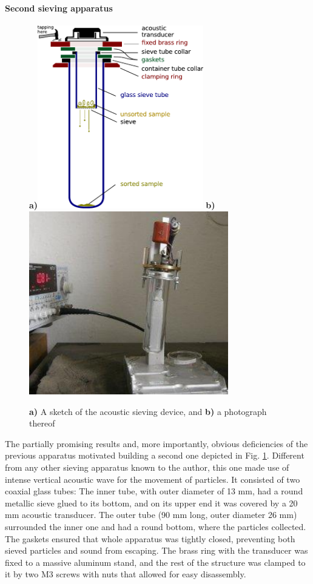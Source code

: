 \paragraph{Second sieving apparatus}%
\begin{figure}[ht] \caption{\textbf{a)} A sketch of the acoustic sieving device, and \textbf{b)} a photograph thereof} \label{fg_sieving2} \centering 
\textbf{a)}\includegraphics[height=8cm]{img/technology/sieve2_sieving_scheme.pdf}
\textbf{b)}\includegraphics[height=8cm]{img/technology/sieving_m.pdf}
\end{figure}
The partially promising results and, more importantly, obvious deficiencies of the previous apparatus motivated building a second one depicted in Fig. \ref{fg_sieving2}.
Different from any other sieving apparatus known to the author, this one made use of intense vertical acoustic wave for the movement of particles. It consisted of two coaxial glass tubes: The inner tube, with outer diameter of 13 mm, had a round metallic sieve glued to its bottom, and on its upper end it was covered by a 20 mm acoustic transducer. The outer tube (90 mm long, outer diameter 26 mm) surrounded the inner one and had a round bottom, where the particles collected. 
The gaskets ensured that whole apparatus was tightly closed, preventing both sieved particles and sound from escaping. The brass ring with the transducer was fixed to a massive aluminum stand, and the rest of the structure was clamped to it by two M3 screws with nuts that allowed for easy disassembly. 

